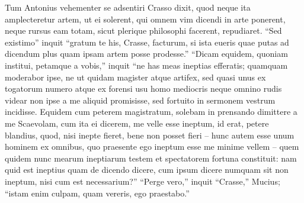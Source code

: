Tum Antonius vehementer se adsentiri Crasso dixit, quod neque ita amplecteretur artem, ut ei solerent, qui omnem vim dicendi in arte ponerent, neque rursus eam totam, sicut plerique philosophi facerent, repudiaret. ``Sed existimo'' inquit ``gratum te his, Crasse, facturum, si ista eueris quae putas ad dicendum plus quam ipsam artem posse prodesse.'' ``Dicam equidem, quoniam institui, petamque a vobis,'' inquit ``ne has meas ineptias efferatis; quamquam moderabor ipse, ne ut quidam magister atque artifex, sed quasi unus ex togatorum numero atque ex forensi usu homo mediocris neque omnino rudis videar non ipse a me aliquid promisisse, sed fortuito in sermonem vestrum incidisse. Equidem cum peterem magistratum, solebam in prensando dimittere a me Scaevolam, cum ita ei dicerem, me velle esse ineptum, id erat, petere blandius, quod, nisi inepte fieret, bene non posset fieri – hunc autem esse unum hominem ex omnibus, quo praesente ego ineptum esse me minime vellem – quem quidem nunc mearum ineptiarum testem et spectatorem fortuna constituit: nam quid est ineptius quam de dicendo dicere, cum ipsum dicere numquam sit non ineptum, nisi cum est necessarium?'' ``Perge vero,'' inquit ``Crasse,'' Mucius; ``istam enim culpam, quam vereris, ego praestabo.''

